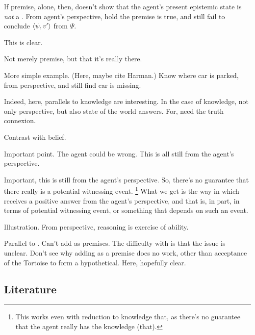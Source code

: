 \begin{note}
  \begin{argument}
    If premise, alone, then, doesn't show that the agent's present epistemic state is \emph{not} a \deadEnd{}.
    From agent's perspective, hold the premise is true, and still fail to conclude \(\langle \psi, v' \rangle\) from \(\Psi\).

    This is clear.

    Not merely premise, but that it's really there.

    More simple example.
    (Here, maybe cite Harman.)
    Know where car is parked, from perspective, and still find car is missing.

    Indeed, here, parallels to knowledge are interesting.
    In the case of knowledge, not only perspective, but also state of the world answers.
    For, need the truth connexion.

    Contrast with belief.

    Important point.
    The agent could be wrong.
    This is all still from the agent's perspective.
  \end{argument}

  Important, this is still from the agent's perspective.
  So, there's no guarantee that there really is a potential witnessing event.%
  \footnote{
    This works even with reduction to knowledge that, as there's no guarantee that the agent really has the knowledge (that).
  }
  What we get is the way in which \qzS{} receives a positive answer from the agent's perspective, and that is, in part, in terms of potential witnessing event, or something that depends on such an event.
\end{note}

\begin{note}
  Illustration.
  From perspective, reasoning is exercise of ability.
\end{note}

\begin{note}
  {
    \color{green}
    Parallel to \citeauthor{Carroll:1895uj}.
    Can't add as premises.
    The difficulty with \citeauthor{Carroll:1895uj} is that the issue is unclear.
    Don't see why adding as a premise does no work, other than acceptance of the Tortoise to form a hypothetical.
    Here, hopefully clear.
  }
\end{note}


\subsection{Literature}
\label{sec:literature}


